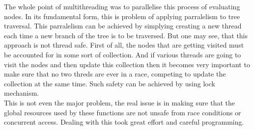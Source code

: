 The whole point of multithreading was to parallelise this process of evaluating nodes. In its fundamental form, this is problem of applying parralelism to tree traversal. This parralelism can be achieved by simplying creating a new thread each time a new branch of the tree is to be traversed. But one may see, that this approach is not thread safe. First of all, the nodes that are getting visited must be accounted for in some sort of collection. And if various threads are going to visit the nodes and then update this collection then it becomes very important to make sure that no two threds are ever in a race, competing to update the collection at the same time. Such safety can be achieved by using lock mechanism.\\
This is not even the major problem, the real issue is in making sure that the global resources used by these functions are not unsafe from race conditions or concurrent access. Dealing with this took great effort and careful programming.
